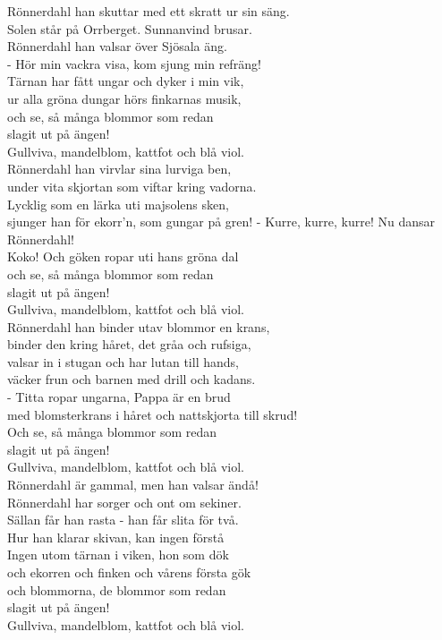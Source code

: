 \documentclass[a6paper,10pt]{article}
\begin{document}
\begin{lyrics}
Rönnerdahl han skuttar med ett skratt ur sin säng.\\
Solen står på Orrberget. Sunnanvind brusar.\\
Rönnerdahl han valsar över Sjösala äng.\\
- Hör min vackra visa, kom sjung min refräng!
\vspace{5pt}\\
Tärnan har fått ungar och dyker i min vik,\\
ur alla gröna dungar hörs finkarnas musik,\\
och se, så många blommor som redan \\
slagit ut på ängen!\\
Gullviva, mandelblom, kattfot och blå viol.
\vspace{5pt}\\
Rönnerdahl han virvlar sina lurviga ben,\\
under vita skjortan som viftar kring vadorna.\\
Lycklig som en lärka uti majsolens sken,\\
sjunger han för ekorr'n, som gungar på gren!
\setlength{\oddsidemargin}{-0.37in}
\noindent
- Kurre, kurre, kurre! Nu dansar Rönnerdahl!\\
Koko! Och göken ropar uti hans gröna dal\\
och se, så många blommor som redan \\
slagit ut på ängen!\\
Gullviva, mandelblom, kattfot och blå viol.
\vspace{5pt}\\
Rönnerdahl han binder utav blommor en krans,\\
binder den kring håret, det gråa och rufsiga,\\
valsar in i stugan och har lutan till hands,\\
väcker frun och barnen med drill och kadans.
\vspace{5pt}\\
- Titta ropar ungarna, Pappa är en brud\\
med blomsterkrans i håret och nattskjorta till skrud!\\
Och se, så många blommor som redan \\
slagit ut på ängen!\\
Gullviva, mandelblom, kattfot och blå viol.
\vspace{5pt}\\
Rönnerdahl är gammal, men han valsar ändå!\\
Rönnerdahl har sorger och ont om sekiner.\\
Sällan får han rasta - han får slita för två.\\
Hur han klarar skivan, kan ingen förstå
\vspace{5pt}\\
Ingen utom tärnan i viken, hon som dök\\
och ekorren och finken och vårens första gök\\
och blommorna, de blommor som redan \\
slagit ut på ängen!\\
Gullviva, mandelblom, kattfot och blå viol. 
\end{lyrics}
\end{document}
